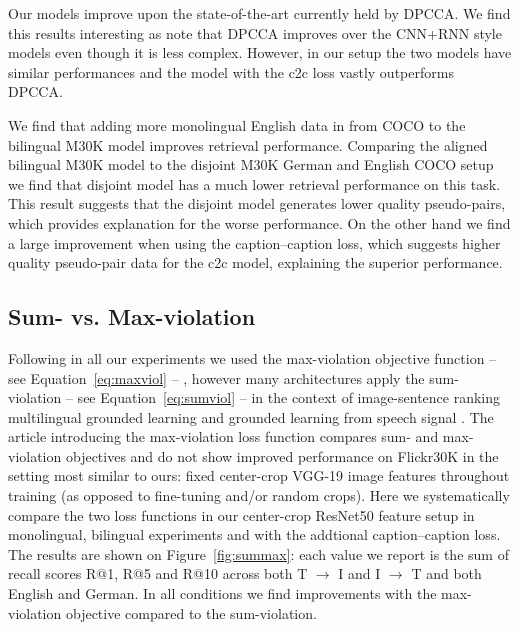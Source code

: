 Our models improve upon the state-of-the-art currently
held by DPCCA. We find this results interesting as 
\cite{rajendran2015bridge} note that DPCCA improves over the
CNN+RNN style models even though it is less complex. However,
in our setup the two models have similar performances and the
model with the c2c loss vastly outperforms DPCCA. 

We find that adding more monolingual English data
in from COCO to the bilingual M30K model improves retrieval
performance. Comparing the aligned bilingual M30K model to the disjoint M30K German and 
English COCO setup we find that disjoint model has a much lower retrieval performance on
this task. This result suggests that the disjoint model generates lower quality pseudo-pairs,
which provides explanation for the worse performance. On the other hand we find a large  
improvement when using the caption--caption loss, which suggests higher quality pseudo-pair 
data for the c2c model, explaining the superior performance.

\subsection{Sum- vs. Max-violation}


Following \cite{kadar2018conll} in all our experiments we used the max-violation 
objective function -- see Equation~\ref{eq:maxviol} -- , however many architectures apply
the sum-violation -- see Equation~\ref{eq:sumviol} --  in the context of image-sentence 
ranking \cite{nam2017dual} multilingual grounded learning \cite{D17-1303} and 
grounded learning from speech signal \cite{chrupala2017representations}. The article
introducing the max-violation loss function \cite{faghri2017vse++} compares sum- and 
max-violation objectives and do not show improved performance on Flickr30K 
in the setting most similar to
ours: fixed center-crop VGG-19 image features throughout training (as opposed to fine-tuning 
and/or random crops). Here we systematically compare the two loss functions 
in our center-crop 
ResNet50 feature setup in monolingual, bilingual experiments and with the addtional 
caption--caption loss.  The results are shown on Figure~\ref{fig:summax}: each 
value we report is the sum of recall scores R@1, R@5 and R@10
across both T $\rightarrow$ I and I $\rightarrow$ T and both
English and German.
In all conditions we find improvements with the max-violation objective
compared to the sum-violation.

